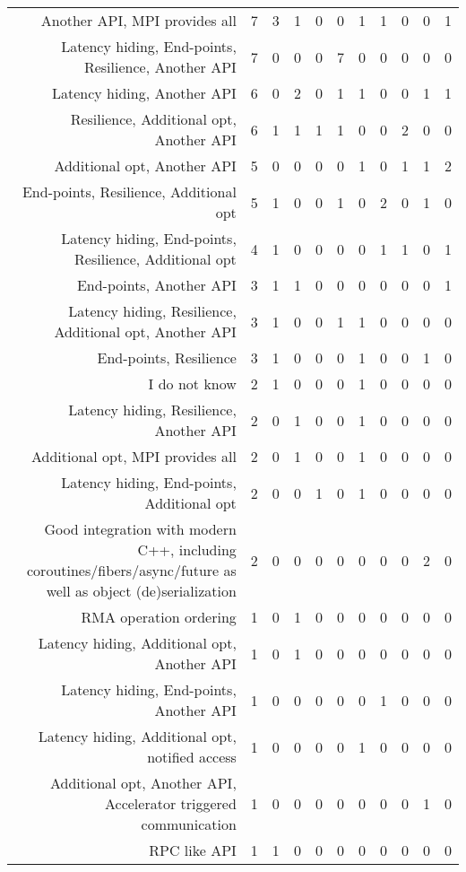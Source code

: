 {\begin{landscape}
\begin{longtable}[htb]{r|c|c|c|c|c|c|c|c|c|c}
{Another API, MPI provides all} & 7 & 3 & 1 & 0 & 0 & 1 & 1 & 0 & 0 & 1 \\%
{Latency hiding, End-points, Resilience, Another API} & 7 & 0 & 0 & 0 & 7 & 0 & 0 & 0 & 0 & 0 \\%
{Latency hiding, Another API} & 6 & 0 & 2 & 0 & 1 & 1 & 0 & 0 & 1 & 1 \\%
{Resilience, Additional opt, Another API} & 6 & 1 & 1 & 1 & 1 & 0 & 0 & 2 & 0 & 0 \\%
{Additional opt, Another API} & 5 & 0 & 0 & 0 & 0 & 1 & 0 & 1 & 1 & 2 \\%
{End-points, Resilience, Additional opt} & 5 & 1 & 0 & 0 & 1 & 0 & 2 & 0 & 1 & 0 \\%
{Latency hiding, End-points, Resilience, Additional opt} & 4 & 1 & 0 & 0 & 0 & 0 & 1 & 1 & 0 & 1 \\%
{End-points, Another API} & 3 & 1 & 1 & 0 & 0 & 0 & 0 & 0 & 0 & 1 \\%
{Latency hiding, Resilience, Additional opt, Another API} & 3 & 1 & 0 & 0 & 1 & 1 & 0 & 0 & 0 & 0 \\%
{End-points, Resilience} & 3 & 1 & 0 & 0 & 0 & 1 & 0 & 0 & 1 & 0 \\%
{I do not know} & 2 & 1 & 0 & 0 & 0 & 1 & 0 & 0 & 0 & 0 \\%
{Latency hiding, Resilience, Another API} & 2 & 0 & 1 & 0 & 0 & 1 & 0 & 0 & 0 & 0 \\%
{Additional opt, MPI provides all} & 2 & 0 & 1 & 0 & 0 & 1 & 0 & 0 & 0 & 0 \\%
{Latency hiding, End-points, Additional opt} & 2 & 0 & 0 & 1 & 0 & 1 & 0 & 0 & 0 & 0 \\%
{Good integration with modern C++, including coroutines/fibers/async/future as well as object (de)serialization} & 2 & 0 & 0 & 0 & 0 & 0 & 0 & 0 & 2 & 0 \\%
{RMA operation ordering} & 1 & 0 & 1 & 0 & 0 & 0 & 0 & 0 & 0 & 0 \\%
{Latency hiding, Additional opt, Another API} & 1 & 0 & 1 & 0 & 0 & 0 & 0 & 0 & 0 & 0 \\%
{Latency hiding, End-points, Another API} & 1 & 0 & 0 & 0 & 0 & 0 & 1 & 0 & 0 & 0 \\%
{Latency hiding, Additional opt, notified access} & 1 & 0 & 0 & 0 & 0 & 1 & 0 & 0 & 0 & 0 \\%
{Additional opt, Another API, Accelerator triggered communication} & 1 & 0 & 0 & 0 & 0 & 0 & 0 & 0 & 1 & 0 \\%
{RPC like API} & 1 & 1 & 0 & 0 & 0 & 0 & 0 & 0 & 0 & 0 \\%

\end{longtable}
\end{landscape}}
